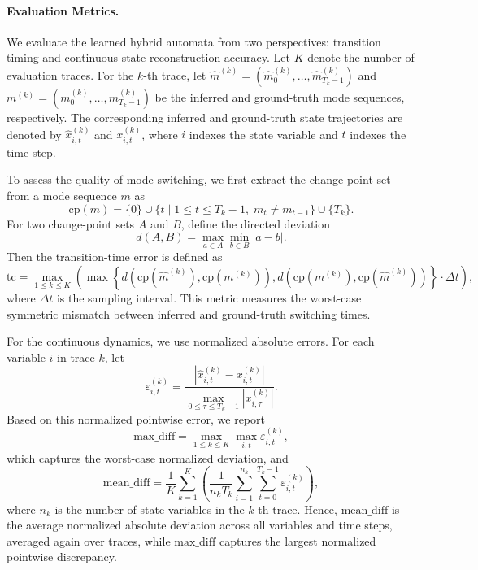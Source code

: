 \paragraph{Evaluation Metrics.}
We evaluate the learned hybrid automata from two perspectives: transition
timing and continuous-state reconstruction accuracy. Let $K$ denote the number
of evaluation traces. For the $k$-th trace, let
$\hat{m}^{(k)} = (\hat{m}^{(k)}_0,\ldots,\hat{m}^{(k)}_{T_k-1})$ and
$m^{(k)} = (m^{(k)}_0,\ldots,m^{(k)}_{T_k-1})$ be the inferred and ground-truth
mode sequences, respectively. The corresponding inferred and ground-truth state
trajectories are denoted by $\hat{x}^{(k)}_{i,t}$ and $x^{(k)}_{i,t}$, where
$i$ indexes the state variable and $t$ indexes the time step.

To assess the quality of mode switching, we first extract the change-point set
from a mode sequence $m$ as
\[
\mathrm{cp}(m)
=
\{0\}
\cup
\{t \mid 1 \le t \le T_k - 1,\; m_t \neq m_{t-1}\}
\cup
\{T_k\}.
\]
For two change-point sets $A$ and $B$, define the directed deviation
\[
d(A,B)=\max_{a\in A}\min_{b\in B}|a-b|.
\]
Then the transition-time error is defined as
\[
\mathrm{tc}
=
\max_{1\le k\le K}
\left(
\max
\left\{
d(\mathrm{cp}(\hat{m}^{(k)}),\mathrm{cp}(m^{(k)})),
d(\mathrm{cp}(m^{(k)}),\mathrm{cp}(\hat{m}^{(k)}))
\right\}
\cdot \Delta t
\right),
\]
where $\Delta t$ is the sampling interval. This metric measures the worst-case
symmetric mismatch between inferred and ground-truth switching times.

For the continuous dynamics, we use normalized absolute errors. For each
variable $i$ in trace $k$, let
\[
\varepsilon^{(k)}_{i,t}
=
\frac{\left|\hat{x}^{(k)}_{i,t}-x^{(k)}_{i,t}\right|}
{\max_{0\le \tau \le T_k-1}\left|x^{(k)}_{i,\tau}\right|}.
\]
Based on this normalized pointwise error, we report
\[
\mathrm{max\_diff}
=
\max_{1\le k\le K}\max_{i,t}\varepsilon^{(k)}_{i,t},
\]
which captures the worst-case normalized deviation, and
\[
\mathrm{mean\_diff}
=
\frac{1}{K}
\sum_{k=1}^{K}
\left(
\frac{1}{n_kT_k}
\sum_{i=1}^{n_k}\sum_{t=0}^{T_k-1}\varepsilon^{(k)}_{i,t}
\right),
\]
where $n_k$ is the number of state variables in the $k$-th trace. Hence,
$\mathrm{mean\_diff}$ is the average normalized absolute deviation across all
variables and time steps, averaged again over traces, while
$\mathrm{max\_diff}$ captures the largest normalized pointwise discrepancy.
